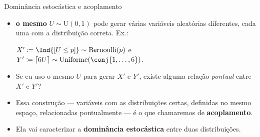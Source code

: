 \documentclass[aspectratio=169]{beamer}
\begin{document}
\begin{frame}{Dominância estocástica e acoplamento}
  \begin{itemize}[<+->]\itemsep=.6cm
  \item \textbf{o mesmo} $U\sim\mathrm{U}(0,1)$ pode gerar várias
    variáveis aleatórias diferentes, cada uma com a distribuição
    correta. Ex.:
    \begin{center}
      $X' \coloneqq \Ind{\colch{U\leq p}} \sim \mathrm{Bernoulli}(p)$ e
      $Y' \coloneqq \lceil 6U \rceil \sim
      \mathrm{Uniforme}(\conj{1,\dots,6})$.
    \end{center}

       
  \item Se eu uso o mesmo $U$ para gerar $X'$ e $Y'$, existe alguma
    relação \emph{pontual} entre $X'$ e $Y'$?

  \item Essa construção — variáveis com as distribuições certas,
    definidas no mesmo espaço, relacionadas pontualmente — é o que
    chamaremos de \textbf{acoplamento}.

  \item Ela vai caracterizar a \textbf{dominância estocástica} entre
    duas distribuições.
  \end{itemize}
\end{frame}


\end{document}
